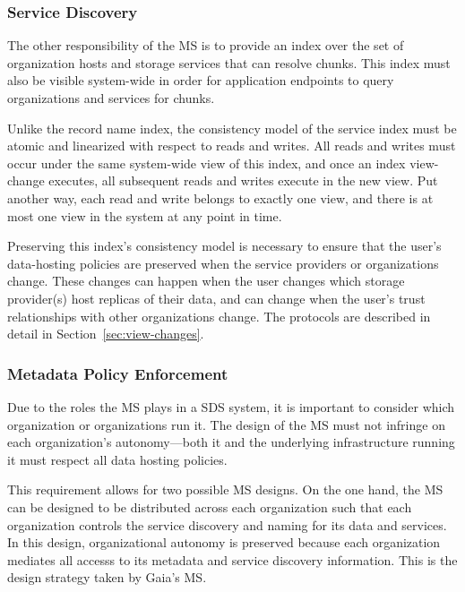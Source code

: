 \subsubsection{Service Discovery}

The other responsibility of the MS is to provide an index over the set of
organization hosts and storage services that can resolve chunks.  This index
must also be visible system-wide in order for application endpoints to query
organizations and services for chunks.

Unlike the record name index, the consistency model of the service
index must be atomic and linearized with respect to reads and writes.
All reads and writes must occur under the same system-wide view of this
index, and once an index view-change executes, all subsequent reads and writes
execute in the new view.  Put another way, each read and write belongs to
exactly one view, and there is at most one view in the system at any point in
time.

Preserving this index's consistency model is necessary to ensure that the user's
data-hosting policies are preserved when the service providers or organizations
change.  These changes can happen when the user changes which storage
provider(s) host replicas of their data, and can change when the user's trust
relationships with other organizations change.  The protocols are described in
detail in Section~\ref{sec:view-changes}.


\subsubsection{Metadata Policy Enforcement}

Due to the roles the MS plays in a SDS system, it is important to consider
which organization or organizations run it.  The design of the MS must not infringe on
each organization's autonomy---both it and the underlying infrastructure
running it must respect all data hosting policies.

This requirement allows for two possible MS designs.  On the one hand,
the MS can be designed to be distributed across each organization such that each
organization controls the service discovery and naming for its data and
services.  In this design, organizational autonomy is preserved because each
organization mediates all accesss to its metadata and service discovery
information.  This is the design strategy taken by
Gaia's MS.

